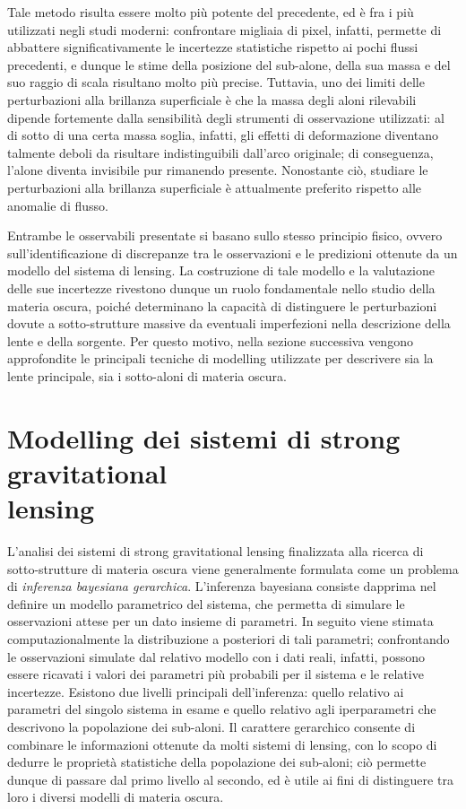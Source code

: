 Tale metodo risulta essere molto più potente del precedente, ed è fra i più utilizzati negli studi moderni: confrontare migliaia di pixel, infatti, permette di abbattere significativamente le incertezze statistiche rispetto ai pochi flussi precedenti, e dunque le stime della posizione del sub-alone, della sua massa e del suo raggio di scala  risultano molto più precise.
Tuttavia, uno dei limiti delle perturbazioni alla brillanza superficiale è che la massa degli aloni rilevabili dipende fortemente dalla sensibilità degli strumenti di osservazione utilizzati: al di sotto di una certa massa soglia, infatti, gli effetti di deformazione diventano talmente deboli da risultare indistinguibili dall'arco originale; di conseguenza, l'alone diventa invisibile pur rimanendo presente. 
Nonostante ciò, studiare le perturbazioni alla brillanza superficiale è attualmente preferito rispetto alle anomalie di flusso. 

Entrambe le osservabili presentate si basano sullo stesso principio fisico, ovvero sull'identificazione di discrepanze tra le osservazioni e le predizioni ottenute da un modello del sistema di lensing. La costruzione di tale modello e la valutazione delle sue incertezze rivestono dunque un ruolo fondamentale nello studio della materia oscura, poiché determinano la capacità di distinguere le perturbazioni dovute a sotto-strutture massive da eventuali imperfezioni nella descrizione della lente e della sorgente. Per questo motivo, nella sezione successiva vengono approfondite le principali tecniche di modelling utilizzate per descrivere sia la lente principale, sia i sotto-aloni di materia oscura.

\section[Modelling dei sistemi di strong gravitational lensing]{Modelling dei sistemi di strong gravitational \\ lensing}

L'analisi dei sistemi di strong gravitational lensing finalizzata alla ricerca di sotto-strutture di materia oscura viene generalmente formulata come un problema di \emph{inferenza bayesiana gerarchica}. 
L'inferenza bayesiana consiste dapprima nel definire un modello parametrico del sistema, che permetta di simulare le osservazioni attese per un dato insieme di parametri. In seguito viene stimata computazionalmente la distribuzione a posteriori di tali parametri; confrontando le osservazioni simulate dal relativo modello con i dati reali, infatti, possono essere ricavati i valori dei parametri più probabili per il sistema e le relative incertezze.
Esistono due livelli principali dell'inferenza: quello relativo ai parametri del singolo sistema in esame e quello relativo agli iperparametri che descrivono la popolazione dei sub-aloni. Il carattere gerarchico consente di combinare le informazioni ottenute da molti sistemi di lensing, con lo scopo di dedurre le proprietà statistiche della popolazione dei sub-aloni; ciò permette dunque di passare dal primo livello al secondo, ed è utile ai fini di distinguere tra loro i diversi modelli di materia oscura.

